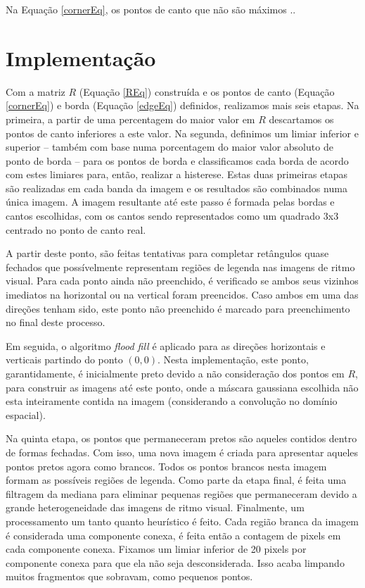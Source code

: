 \documentclass[12pt]{article}
\begin{document}
Na Equação \ref{cornerEq}, os pontos de canto que não são máximos ..

\section{Implementação}

Com a matriz  $R$ (Equação \ref{REq}) construída e  os pontos de canto
(Equação  \ref{cornerEq}) e  borda  (Equação \ref{edgeEq})  definidos,
realizamos mais seis etapas. Na  primeira, a partir de uma percentagem
do maior valor em $R$ descartamos os pontos de canto inferiores a este
valor. Na segunda,  definimos um limiar inferior e  superior -- também
com base numa porcentagem do maior valor absoluto de ponto de borda --
para os pontos de borda e classificamos cada borda de acordo com estes
limiares  para, então,  realizar  a histerese.   Estas duas  primeiras
etapas  são realizadas em  cada banda  da imagem  e os  resultados são
combinados numa  única imagem.  A  imagem resultante até este  passo é
formada  pelas  bordas  e  cantos  escolhidas,  com  os  cantos  sendo
representados como um quadrado 3x3 centrado no ponto de canto real.

A partir deste ponto,  são feitas tentativas para completar retângulos
quase fechados  que possívelmente  representam regiões de  legenda nas
imagens  de ritmo  visual. Para  cada  ponto ainda  não preenchido,  é
verificado  se  ambos seus  vizinhos  imediatos  na  horizontal ou  na
vertical  foram preencidos.   Caso ambos  em uma  das  direções tenham
sido, este ponto não preenchido  é marcado para preenchimento no final
deste processo.

Em  seguida,  o  algoritmo  \textit{flood  fill} é  aplicado  para  as
direções  horizontais e verticais  partindo do  ponto $(0,  0)$. Nesta
implementação, este ponto, garantidamente, é inicialmente preto devido
a não  consideração dos pontos em  $R$, para construir  as imagens até
este ponto,  onde a máscara gaussiana escolhida  não esta inteiramente
contida na imagem (considerando a convolução no domínio espacial).

Na  quinta  etapa,  os  pontos  que permaneceram  pretos  são  aqueles
contidos dentro de formas fechadas. Com isso, uma nova imagem é criada
para apresentar  aqueles pontos pretos  agora como brancos.   Todos os
pontos brancos  nesta imagem formam  as possíveis regiões  de legenda.
Como  parte da  etapa final,  é feita  uma filtragem  da  mediana para
eliminar   pequenas   regiões  que   permaneceram   devido  a   grande
heterogeneidade   das  imagens   de  ritmo   visual.   Finalmente,  um
processamento um  tanto quanto heurístico é feito.  Cada região branca
da  imagem  é considerada  uma  componente  conexa,  é feita  então  a
contagem  de  pixels em  cada  componente  conexa.  Fixamos um  limiar
inferior  de 20 pixels  por componente  conexa para  que ela  não seja
desconsiderada.  Isso acaba limpando  muitos fragmentos  que sobravam,
como pequenos pontos.
\end{document}
